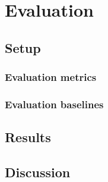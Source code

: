 
\chapter{Evaluation}\label{chapter:evaluation}

\section{Setup}
\subsection{Evaluation metrics}
\subsection{Evaluation baselines}

\section{Results}
\section{Discussion}
